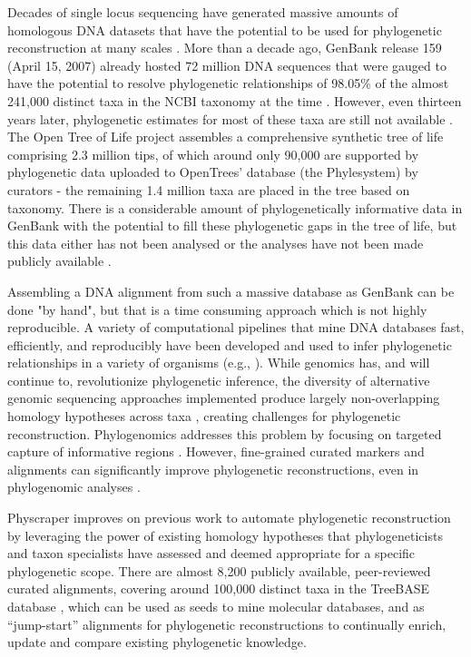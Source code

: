 \documentclass{bmcart}
\begin{document}
Decades of single locus sequencing have generated
massive amounts of homologous DNA datasets that have the potential to be used for phylogenetic
reconstruction at many scales \cite{sanderson2008phylota}.
More than a decade ago, GenBank release 159 (April 15, 2007) already hosted 72
million DNA sequences that were gauged to have the potential to resolve phylogenetic
relationships of 98.05\% of the almost 241,000
distinct taxa in the NCBI taxonomy at the time \cite{sanderson2008phylota}.
However, even thirteen years later, phylogenetic estimates for most of these taxa
are still not available \cite{mctavish_how_2017}.
The Open Tree of Life project assembles a comprehensive synthetic tree of life comprising
2.3 million tips, of which around only
90,000 are supported by phylogenetic data uploaded to OpenTrees' database (the Phylesystem) by curators - the remaining 1.4 million taxa are placed
in the tree based on taxonomy.
There is a considerable amount of phylogenetically
informative data in GenBank with the potential to fill these phylogenetic gaps in
the tree of life, but this data either has not been analysed or the analyses
have not been made publicly available \cite{mctavish_how_2017}.

Assembling a DNA alignment from such a massive database as GenBank can be done "by hand",
but that is a time consuming approach which is not highly reproducible.
A variety of computational pipelines that mine DNA databases fast, efficiently, and reproducibly
have been developed and used to infer phylogenetic relationships in a variety of organisms
(e.g., \cite{smith2009mega, antonelli2017toward, izquierdo2014pumper, pearse2013phylogenerator}).
While genomics has, and will continue to, revolutionize phylogenetic inference,
the diversity of alternative genomic sequencing approaches implemented produce
largely non-overlapping homology hypotheses across taxa \cite{jones2016targeted},
creating challenges for phylogenetic reconstruction.
Phylogenomics addresses this problem by focusing on targeted capture of informative
regions \cite{andermann2020guide}.
However, fine-grained curated markers and alignments can significantly improve phylogenetic
reconstructions, even in phylogenomic analyses \cite{fragoso2017pilot}.

Physcraper improves on previous work to automate phylogenetic reconstruction by leveraging
the power of existing homology hypotheses that phylogeneticists and taxon specialists have assessed
and deemed appropriate for a specific phylogenetic scope.
There are almost 8,200 publicly available, peer-reviewed curated alignments, covering
around 100,000 distinct taxa in the TreeBASE database
\cite{piel2009treebase, vos2012nexml, piel2018treebasedmp, treebase_website, supertreebase},
which can be used as seeds to mine molecular databases, and as ``jump-start'' alignments
for phylogenetic reconstructions \cite{morrison2006multiple} to continually enrich,
update and compare existing phylogenetic knowledge.
\end{document}
